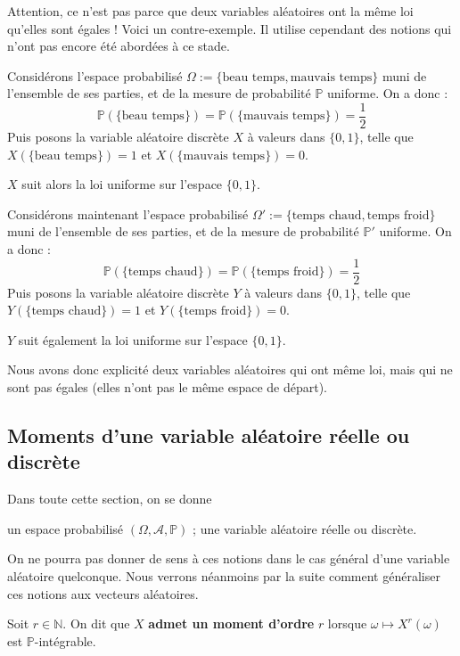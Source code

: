 \documentclass[../integ-proba.tex]{subfiles}
\begin{document}
\begin{rem}
    Attention, ce n'est pas parce que deux variables aléatoires ont la même loi qu'elles sont égales !
    Voici un contre-exemple. Il utilise cependant des notions qui n'ont pas encore été abordées à ce stade.
    
    Considérons l'espace probabilisé $\Omega := \{\text{beau temps}, \text{mauvais temps}\}$ muni de l'ensemble de ses parties, et de la mesure de probabilité $\mathbb{P}$ uniforme.
    On a donc :
    $$
    \mathbb{P}(\{\text{beau temps}\}) = \mathbb{P}(\{\text{mauvais temps}\}) = \frac{1}{2}
    $$
    Puis posons la variable aléatoire discrète $X$ à valeurs dans $\{0,1\}$, telle que $X(\{\text{beau temps}\})=1$ et $X(\{\text{mauvais temps}\})=0$.
    
    $X$ suit alors la loi uniforme sur l'espace $\{0,1\}$.

    Considérons maintenant l'espace probabilisé $\Omega' := \{\text{temps chaud}, \text{temps froid}\}$ muni de l'ensemble de ses parties, et de la mesure de probabilité $\mathbb{P}'$ uniforme.
    On a donc :
    $$
    \mathbb{P}(\{\text{temps chaud}\}) = \mathbb{P}(\{\text{temps froid}\}) = \frac{1}{2}
    $$
    Puis posons la variable aléatoire discrète $Y$ à valeurs dans $\{0,1\}$, telle que $Y(\{\text{temps chaud}\})=1$ et $Y(\{\text{temps froid}\})=0$.

    $Y$ suit également la loi uniforme sur l'espace $\{0,1\}$.

    Nous avons donc explicité deux variables aléatoires qui ont même loi, mais qui ne sont pas égales (elles n'ont pas le même espace de départ).
\end{rem}

\subsection{Moments d'une variable aléatoire réelle ou discrète}

Dans toute cette section, on se donne
\begin{itemize}
    \itemb un espace probabilisé $\left(\Omega, \mathcal{A}, \mathbb{P}\right)$ ;
    \itemb une variable aléatoire réelle ou discrète.
\end{itemize}

On ne pourra pas donner de sens à ces notions dans le cas général d'une variable aléatoire quelconque.
Nous verrons néanmoins par la suite comment généraliser ces notions aux vecteurs aléatoires.

\begin{defi}
    Soit $r\in\mathbb{N}$. On dit que $X$ \textbf{admet un moment d'ordre} $r$ lorsque $\omega \mapsto X^r(\omega)$ est $\mathbb{P}$-intégrable.
\end{defi}
\end{document}
